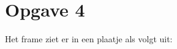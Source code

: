 \documentclass[a4paper,11pt]{article}
\begin{document}











\section*{Opgave 4}

Het frame ziet er in een plaatje als volgt uit:

%
\end{document}
